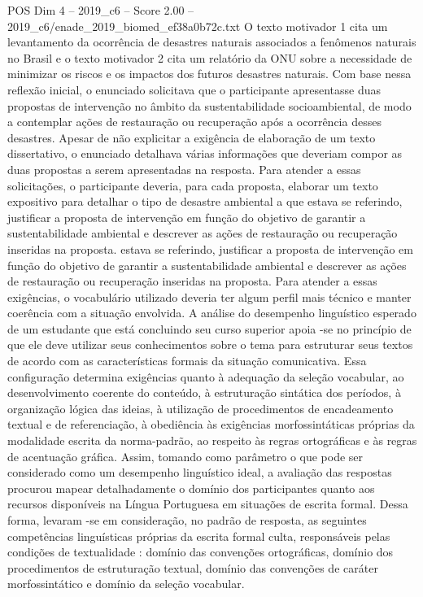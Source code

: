 \begin{textsample}{POS Dim 4 – 2019\_c6 – Score 2.00 – 2019\_c6/enade\_2019\_biomed\_ef38a0b72c.txt}
O texto motivador 1 cita um levantamento da ocorrência de desastres naturais associados a fenômenos naturais no Brasil e o texto motivador 2 cita um relatório da ONU sobre a necessidade de minimizar os riscos e os impactos dos futuros desastres naturais.
Com base nessa reflexão inicial, o enunciado solicitava que o participante apresentasse duas propostas de intervenção no âmbito da sustentabilidade socioambiental, de modo a contemplar ações de restauração ou recuperação após a ocorrência desses desastres.
Apesar de não explicitar a exigência de elaboração de um texto dissertativo, o enunciado detalhava várias informações que deveriam compor as duas propostas a serem apresentadas na resposta.
Para atender a essas solicitações, o participante deveria, para cada proposta, elaborar um texto expositivo para detalhar o tipo de desastre ambiental a que estava se referindo, justificar a proposta de intervenção em função do objetivo de garantir a sustentabilidade ambiental e descrever as ações de restauração ou recuperação inseridas na proposta. estava se referindo, justificar a proposta de intervenção em função do objetivo de garantir a sustentabilidade ambiental e descrever as ações de restauração ou recuperação inseridas na proposta.
Para atender a essas exigências, o vocabulário utilizado deveria ter algum perfil mais técnico e manter coerência com a situação envolvida.
A análise do desempenho linguístico esperado de um estudante que está concluindo seu curso superior apoia -se no princípio de que ele deve utilizar seus conhecimentos sobre o tema para estruturar seus textos de acordo com as características formais da situação comunicativa.
Essa configuração determina exigências quanto à adequação da seleção vocabular, ao desenvolvimento coerente do conteúdo, à estruturação sintática dos períodos, à organização lógica das ideias, à utilização de procedimentos de encadeamento textual e de referenciação, à obediência às exigências morfossintáticas próprias da modalidade escrita da norma-padrão, ao respeito às regras ortográficas e às regras de acentuação gráfica.
Assim, tomando como parâmetro o que pode ser considerado como um desempenho linguístico ideal, a avaliação das respostas procurou mapear detalhadamente o domínio dos participantes quanto aos recursos disponíveis na Língua Portuguesa em situações de escrita formal.
Dessa forma, levaram -se em consideração, no padrão de resposta, as seguintes competências linguísticas próprias da escrita formal culta, responsáveis pelas condições de textualidade : domínio das convenções ortográficas, domínio dos procedimentos de estruturação textual, domínio das convenções de caráter morfossintático e domínio da seleção vocabular.

\end{textsample}
